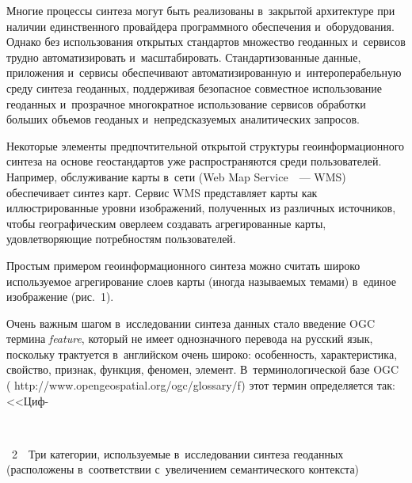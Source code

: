 \begin{multicols}{2}
     Многие процессы синтеза могут быть реализованы в~закрытой 
архитектуре при наличии единственного провайдера программного обеспечения и~оборудования. Однако без использования открытых стандартов множество 
геоданных и~сервисов трудно автоматизировать и~масштабировать. 
Стандартизованные данные, приложения и~сервисы обеспечивают 
автоматизированную и~интероперабельную среду синтеза геоданных, 
поддерживая безопасное совместное использование геоданных и~прозрачное 
многократное использование сервисов обработки больших объемов геоданых 
и~непредсказуемых аналитических запросов.
     
     Некоторые элементы предпочтительной открытой структуры 
геоинформационного синтеза на основе геостандартов уже распространяются 
среди пользователей. Например, обслуживание карты в~сети (Web Map 
Service~\cite{5-dul}~--- WMS) обеспечивает синтез карт. Сервис
WMS представляет 
карты как иллюстрированные уровни изображений, полученных из различных 
источников, чтобы географическим оверлеем создавать агрегированные карты, 
удовлетворяющие потребностям пользователей.
     
     Простым примером геоинформационного синтеза можно считать широко 
используемое агрегирование слоев карты (иногда называемых темами) в~единое 
изображение (рис.~1).
     

      
     Очень важным шагом в~исследовании синтеза данных стало введение 
OGC термина \textit{feature}, который не имеет однозначного перевода на 
русский язык, поскольку трактуется в~английском очень широко: особенность, 
характеристика, свойство, признак, функция, феномен, элемент. 
В~терминологической базе OGC ({\sf 
http://www.opengeospatial.org/\linebreak ogc/glossary/f}) этот термин определяется так: 
<<Циф-\linebreak\vspace*{-12pt}

{ \begin{center}  %
 \vspace*{-3pt}
   \mbox{%
 \epsfxsize=77.503mm 
 }


\end{center}


\noindent
{{\figurename~2}\ \ \small{Три категории, используемые в~исследовании синтеза геоданных 
(расположены в~соответствии с~увеличением семантического контекста)}}
}

\vspace*{9pt}


\end{multicols}
